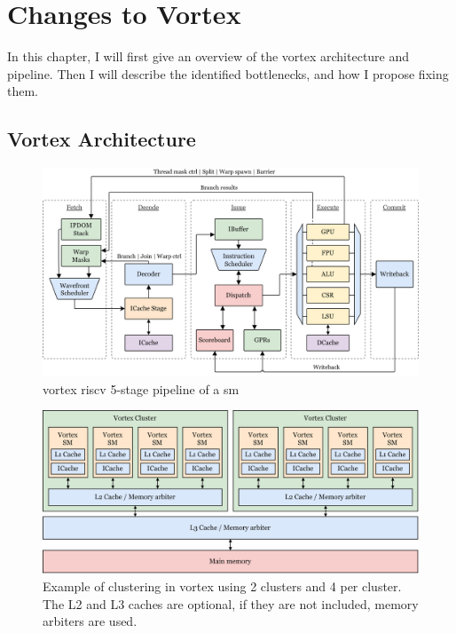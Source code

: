 \chapter{Changes to Vortex} \label{chap:changes}

In this chapter, I will first give an overview of the \Gls{vortex} architecture and pipeline. Then I will describe the identified bottlenecks, and how I propose fixing them.

\section{Vortex Architecture}

\begin{figure}
    \centering
    \includegraphics[width=\textwidth]{figures/vortex-pipeline3.png}
    \caption{\Gls{vortex} \Gls{riscv} 5-stage pipeline of a \acrlong{sm}}
    \label{fig:vortex_microarchitecture}
\end{figure}

\begin{figure}
    \centering
    \includegraphics[width=\textwidth]{figures/vortex-cluster-color.png}
    \caption[Clustering of  in \Gls{vortex}.]{Example of  clustering in \Gls{vortex} using 2 clusters and 4  per cluster. The L2 and L3 caches are optional, if they are not included, memory arbiters are used.}
    \label{fig:clustering}
\end{figure}

